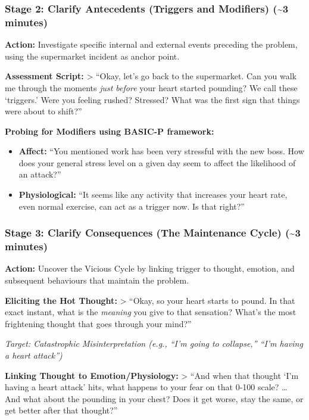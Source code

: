 \documentclass[
  american,
  letterpaper,
  DIV=11,
  numbers=noendperiod]{scrartcl}
\providecommand{\tightlist}{%
  \setlength{\itemsep}{0pt}\setlength{\parskip}{0pt}}
\begin{document}
\subsubsection{Stage 2: Clarify Antecedents (Triggers and Modifiers)
(\textasciitilde3
minutes)}\label{stage-2-clarify-antecedents-triggers-and-modifiers-3-minutes}

\textbf{Action:} Investigate specific internal and external events
preceding the problem, using the supermarket incident as anchor point.

\textbf{Assessment Script:} \textgreater{} ``Okay, let's go back to the
supermarket. Can you walk me through the moments \emph{just before} your
heart started pounding? We call these `triggers.' Were you feeling
rushed? Stressed? What was the first sign that things were about to
shift?''

\textbf{Probing for Modifiers using BASIC-P framework:}

\begin{itemize}
\tightlist
\item
  \textbf{Affect:} ``You mentioned work has been very stressful with the
  new boss. How does your general stress level on a given day seem to
  affect the likelihood of an attack?''
\item
  \textbf{Physiological:} ``It seems like any activity that increases
  your heart rate, even normal exercise, can act as a trigger now. Is
  that right?''
\end{itemize}

\subsubsection{Stage 3: Clarify Consequences (The Maintenance Cycle)
(\textasciitilde3
minutes)}\label{stage-3-clarify-consequences-the-maintenance-cycle-3-minutes}

\textbf{Action:} Uncover the Vicious Cycle by linking trigger to
thought, emotion, and subsequent behaviours that maintain the problem.

\textbf{Eliciting the Hot Thought:} \textgreater{} ``Okay, so your heart
starts to pound. In that exact instant, what is the \emph{meaning} you
give to that sensation? What's the most frightening thought that goes
through your mind?''

\emph{Target: Catastrophic Misinterpretation (e.g., ``I'm going to
collapse,'' ``I'm having a heart attack'')}

\textbf{Linking Thought to Emotion/Physiology:} \textgreater{} ``And
when that thought `I'm having a heart attack' hits, what happens to your
fear on that 0-100 scale? \ldots{} And what about the pounding in your
chest? Does it get worse, stay the same, or get better after that
thought?''
\end{document}
